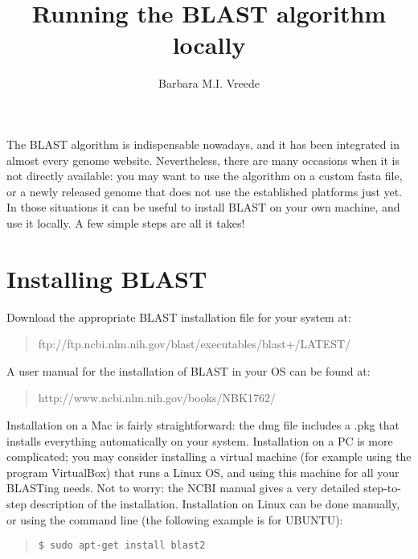 \documentclass[12pt]{article}
\title{Running the BLAST algorithm locally}
\author{Barbara M.I. Vreede}
\begin{document}
\maketitle
The BLAST algorithm is indispensable nowadays, and it has been integrated in almost every genome website. Nevertheless, there are many occasions when it is not directly available: you may want to use the algorithm on a custom fasta file, or a newly released genome that does not use the established platforms just yet. In those situations it can be useful to install BLAST on your own machine, and use it locally. A few simple steps are all it takes!
\section{Installing BLAST}
Download the appropriate BLAST installation file for your system at:
\begin{quote}
{ftp://ftp.ncbi.nlm.nih.gov/blast/executables/blast+/LATEST/}
\end{quote}
A user manual for the installation of BLAST in your OS can be found at:
\begin{quote}{http://www.ncbi.nlm.nih.gov/books/NBK1762/}
\end{quote}
Installation on a Mac is fairly straightforward: the dmg file includes a .pkg that installs everything automatically on your system. Installation on a PC is more complicated; you may consider installing a virtual machine (for example using the program VirtualBox) that runs a Linux OS, and using this machine for all your BLASTing needs. Not to worry: the NCBI manual gives a very detailed step-to-step description of the installation. Installation on Linux can be done manually, or using the command line (the following example is for UBUNTU):
\begin{quote}
\begin{verbatim}
$ sudo apt-get install blast2
\end{verbatim}
\end{quote}
\end{document}
